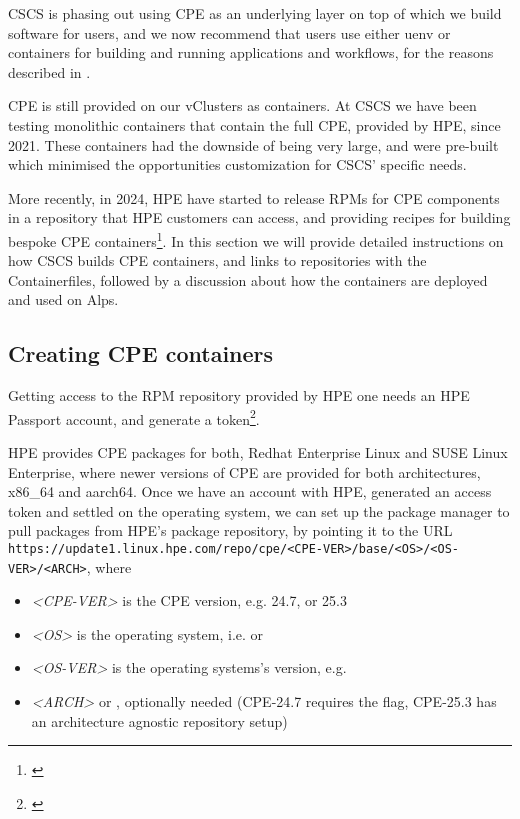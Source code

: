 CSCS is phasing out using CPE as an underlying layer on top of which we build software for users, and we now recommend that users use either uenv or containers for building and running applications and workflows, for the reasons described in .

CPE is still provided on our vClusters as containers.
At CSCS we have been testing monolithic containers that contain the full CPE, provided by HPE, since 2021.
These containers had the downside of being very large, and were pre-built which minimised the opportunities customization for CSCS' specific needs.

More recently, in 2024, HPE have started to release RPMs for CPE components in a repository that HPE customers can access, and providing recipes for building bespoke CPE containers\footnote{\href{https://cpe.ext.hpe.com/docs/latest/install/installation-guidance-container.html}{}}.
In this section we will provide detailed instructions on how CSCS builds CPE containers, and links to repositories with the Containerfiles, followed by a discussion about how the containers are deployed and used on Alps.

\subsection{Creating CPE containers}
\label{sec:cpe-container-create}
Getting access to the RPM repository provided by HPE one needs an HPE Passport account, and generate a token\footnote{\href{https://cpe.ext.hpe.com/docs/latest/install/token-authed-repo.html}{}}.

HPE provides CPE packages for both, Redhat Enterprise Linux and SUSE Linux Enterprise, where newer versions of CPE are provided for both architectures, x86\_64 and aarch64.
Once we have an account with HPE, generated an access token and settled on the operating system, we can set up the package manager to pull packages from HPE's package repository, by pointing it to the URL \lstinline{https://update1.linux.hpe.com/repo/cpe/<CPE-VER>/base/<OS>/<OS-VER>/<ARCH>}, where

\begin{itemize}
    \item \emph{\textless CPE-VER\textgreater} is the CPE version, e.g. 24.7, or 25.3
    \item \emph{\textless OS\textgreater} is the operating system, i.e.  or 
    \item \emph{\textless OS-VER\textgreater} is the operating systems's version, e.g. 
    \item \emph{\textless ARCH\textgreater}  or , optionally needed (CPE-24.7 requires the flag, CPE-25.3 has an architecture agnostic repository setup)
\end{itemize}

